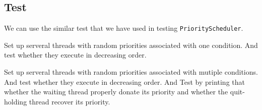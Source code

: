 \documentclass{article}
\begin{document}
\subsection{Test}
We can use the similar test that we have used in testing \texttt{PriorityScheduler}.
\begin{compactitem}
	\item Set up serveral threads with random priorities associated with one condition. And test whether they execute in decreasing order.
	\item Set up serveral threads with random priorities associated with mutiple conditions. And test whether they execute in decreasing order. And
		Test by printing that whether the waiting thread properly donate its priority and whether the quit-holding thread recover its priority.
\end{compactitem}
\end{document}
